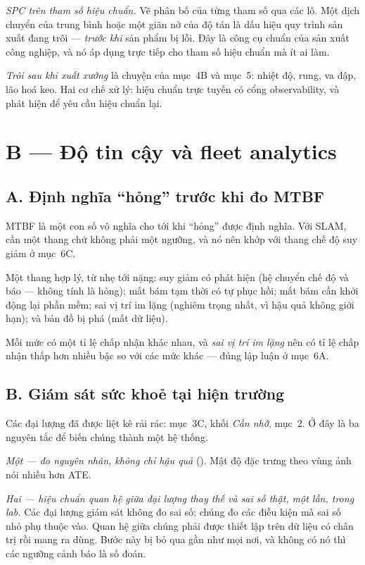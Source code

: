 \documentclass[../../vslam.tex]{subfiles}
\begin{document}
\emph{SPC trên tham số hiệu chuẩn.} Vẽ phân bố của từng tham số qua các lô. Một dịch chuyển của trung bình hoặc một giãn nở của độ tán là dấu hiệu quy trình sản xuất đang trôi --- \emph{trước khi} sản phẩm bị lỗi. Đây là công cụ chuẩn của sản xuất công nghiệp, và nó áp dụng trực tiếp cho tham số hiệu chuẩn mà ít ai làm.

\emph{Trôi sau khi xuất xưởng} là chuyện của  mục~4B và  mục~5: nhiệt độ, rung, va đập, lão hoá keo. Hai cơ chế xử lý: hiệu chuẩn trực tuyến có cổng observability, và phát hiện để yêu cầu hiệu chuẩn lại.

\section{B --- Độ tin cậy và fleet analytics}

\subsection{A. Định nghĩa ``hỏng'' trước khi đo MTBF}

MTBF là một con số vô nghĩa cho tới khi ``hỏng'' được định nghĩa. Với SLAM, cần một thang chứ không phải một ngưỡng, và nó nên khớp với thang chế độ suy giảm ở  mục~6C.

Một thang hợp lý, từ nhẹ tới nặng: suy giảm có phát hiện (hệ chuyển chế độ và báo --- không tính là hỏng); mất bám tạm thời có tự phục hồi; mất bám cần khởi động lại phần mềm; sai vị trí im lặng (nghiêm trọng nhất, vì hậu quả không giới hạn); và bản đồ bị phá (mất dữ liệu).

Mỗi mức có một tỉ lệ chấp nhận khác nhau, và \emph{sai vị trí im lặng} nên có tỉ lệ chấp nhận thấp hơn nhiều bậc so với các mức khác --- đúng lập luận ở  mục~6A.

\subsection{B. Giám sát sức khoẻ tại hiện trường}

Các đại lượng đã được liệt kê rải rác:  mục~3C,  khối \emph{Cần nhớ},  mục~2. Ở đây là ba nguyên tắc để biến chúng thành một hệ thống.

\emph{Một --- đo nguyên nhân, không chỉ hậu quả} (). Mật độ đặc trưng theo vùng ảnh nói nhiều hơn ATE.

\emph{Hai --- hiệu chuẩn quan hệ giữa đại lượng thay thế và sai số thật, một lần, trong lab.} Các đại lượng giám sát không đo sai số; chúng đo các điều kiện mà sai số nhỏ phụ thuộc vào. Quan hệ giữa chúng phải được thiết lập trên dữ liệu có chân trị rồi mang ra dùng. Bước này bị bỏ qua gần như mọi nơi, và không có nó thì các ngưỡng cảnh báo là số đoán.
\end{document}
